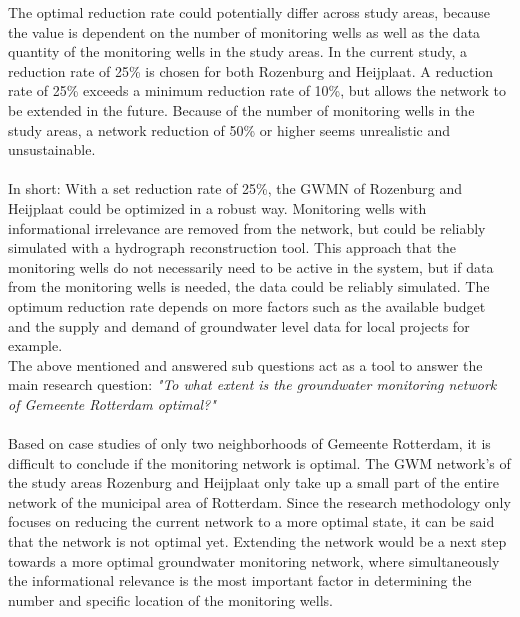 The optimal reduction rate could potentially differ across study areas, because the value is dependent on the number of monitoring wells as well as the data quantity of the monitoring wells in the study areas. In the current study, a reduction rate of 25\% is chosen for both Rozenburg and Heijplaat. A reduction rate of 25\% exceeds a minimum reduction rate of 10\%, but allows the network to be extended in the future. Because of the number of monitoring wells in the study areas, a network reduction of 50\% or higher seems unrealistic and unsustainable. \\
\\
In short: With a set reduction rate of 25\%, the GWMN of Rozenburg and Heijplaat could be optimized in a robust way. Monitoring wells with informational irrelevance are removed from the network, but could be reliably simulated with a hydrograph reconstruction tool. This approach that the monitoring wells do not necessarily need to be active in the system, but if data from the monitoring wells is needed, the data could be reliably simulated. The optimum reduction rate depends on more factors such as the available budget and the supply and demand of groundwater level data for local projects for example.
\newline
\\
The above mentioned and answered sub questions act as a tool to answer the main research question: 
\textit{"To what extent is the groundwater monitoring network of Gemeente Rotterdam optimal?"}\\
\\
Based on case studies of only two neighborhoods of Gemeente Rotterdam, it is difficult to conclude if the monitoring network is optimal. The GWM network's of the study areas Rozenburg and Heijplaat only take up a small part of the entire network of the municipal area of Rotterdam. Since the research methodology only focuses on reducing the current network to a more optimal state, it can be said that the network is not optimal yet. Extending the network would be a next step towards a more optimal groundwater monitoring network, where simultaneously the informational relevance is the most important factor in determining the number and specific location of the monitoring wells. 



